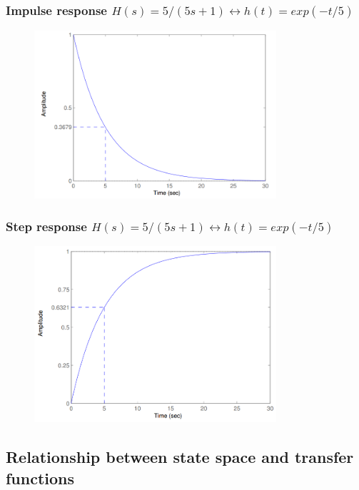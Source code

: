\begin{frame}
\frametitle{Impulse response $H(s)=5/(5s+1) \leftrightarrow h(t)=exp(-t/5)$}
\begin{figure}
\centering
\includegraphics[width=0.8\textwidth]{time-constant-impulse.png}
\end{figure}
\end{frame}

\begin{frame}
\frametitle{Step response $H(s)=5/(5s+1) \leftrightarrow h(t)=exp(-t/5)$}
	\begin{figure}
	\centering
	\includegraphics[width=0.8\textwidth]{time-constant-step.png}
	\end{figure}
\end{frame}

\subsection{Relationship between state space and transfer functions}

